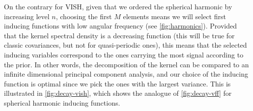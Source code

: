 On the contrary for VISH, given that we ordered the spherical harmonic by increasing level $n$, choosing the first $M$ elements means we will select first inducing functions with low angular frequency (see \cref{fig:harmonics}). Provided that the kernel spectral density is a decreasing function (this will be true for classic covariances, but not for quasi-periodic ones), this means that the selected inducing variables correspond to the ones carrying the most signal according to the prior. In other words, the decomposition of the kernel can be compared to an infinite dimensional principal component analysis, and our choice of the inducing function is optimal since we pick the ones with the largest variance. This is illustrated in \cref{fig:decay-vish}, which shows the analogue of \cref{fig:decay-vff} for spherical harmonic inducing functions.


